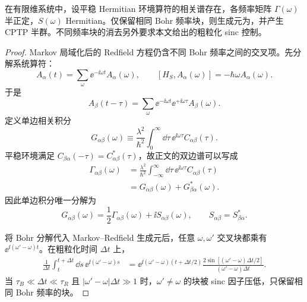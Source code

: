\begin{proposition}
在有限维系统中，设平稳 Hermitian 环境算符的相关谱存在，各频率矩阵 $\Gamma(\omega)$ 半正定，$S(\omega)$ Hermitian。仅保留相同 Bohr 频率块，则生成元为，并产生 CPTP 半群。不同频率块的消去另外要求本文给出的粗粒化 sinc 控制。
\end{proposition}
\begin{proof}
Markov 局域化后的 Redfield 方程仍含不同 Bohr 频率之间的交叉项。先分解系统算符：
\[
A_\alpha(t)=\sum_\omega\ee^{-\ii\omega t}A_\alpha(\omega),
\qquad
[H_S,A_\alpha(\omega)]=-\hbar\omega A_\alpha(\omega).
\]
于是
\[
A_\beta(t-\tau)
=\sum_\omega\ee^{-\ii\omega t}\ee^{+\ii\omega\tau}A_\beta(\omega).
\]
定义单边相关积分
\[
G_{\alpha\beta}(\omega)
\equiv\frac{\lambda^2}{\hbar^2}
\int_0^\infty\dd\tau\,
\ee^{\ii\omega\tau}C_{\alpha\beta}(\tau).
\]
平稳环境满足
$C_{\beta\alpha}(-\tau)=C_{\alpha\beta}^*(\tau)$，故正文的双边谱可以写成
\begin{align*}
\Gamma_{\alpha\beta}(\omega)
&=\frac{\lambda^2}{\hbar^2}
\int_{-\infty}^{\infty}\dd\tau\,
\ee^{\ii\omega\tau}C_{\alpha\beta}(\tau)\\
&=G_{\alpha\beta}(\omega)+G_{\beta\alpha}^*(\omega).
\end{align*}
因此单边积分唯一分解为
\[
G_{\alpha\beta}(\omega)
=\frac12\Gamma_{\alpha\beta}(\omega)
+\ii S_{\alpha\beta}(\omega),
\qquad
S_{\alpha\beta}=S_{\beta\alpha}^*.
\]

将 Bohr 分解代入 Markov--Redfield 生成元后，任意 $\omega,\omega'$ 交叉块都乘有
$\ee^{\ii(\omega'-\omega)t}$。在粗粒化时间 $\Delta t$ 上，
\begin{align*}
\frac1{\Delta t}\int_t^{t+\Delta t}\dd s\,
\ee^{\ii(\omega'-\omega)s}
&=\ee^{\ii(\omega'-\omega)(t+\Delta t/2)}
\frac{2\sin[(\omega'-\omega)\Delta t/2]}
{(\omega'-\omega)\Delta t}.
\end{align*}
当 $\tau_B\ll\Delta t\ll\tau_R$ 且
$|\omega'-\omega|\Delta t\gg1$ 时，$\omega'\ne\omega$ 的块被 sinc 因子压低，只保留相同 Bohr 频率的块。


\end{proof}
